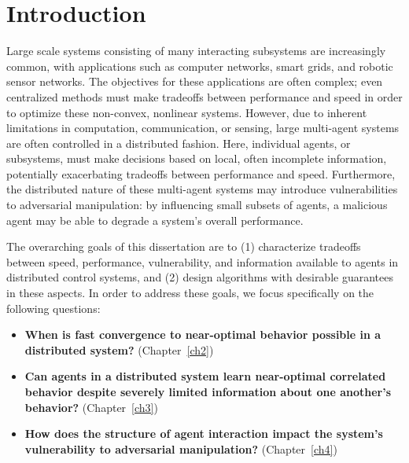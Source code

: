 \chapter{\Large Introduction}
\label{introchap}

Large scale systems consisting of many interacting subsystems are increasingly common, with applications such as computer networks, smart grids, and robotic sensor networks. The objectives for these applications are often complex; even centralized methods must make tradeoffs between performance and speed in order to optimize these non-convex, nonlinear systems. However, due to inherent limitations in computation, communication, or sensing, large multi-agent systems are often controlled in a distributed fashion. Here, individual agents, or subsystems, must make decisions based on local, often incomplete information, potentially exacerbating tradeoffs between performance and speed. Furthermore, the distributed nature of these multi-agent systems may introduce vulnerabilities to adversarial manipulation: by influencing small subsets of agents, a malicious agent may be able to degrade a system's overall performance.%

The overarching goals of this dissertation are to (1) characterize tradeoffs between speed, performance, vulnerability, and information available to agents in distributed control systems, and (2) design algorithms with desirable guarantees in these aspects. %
In order to address these goals, we focus specifically on the following questions:


\begin{itemize}[leftmargin=*]
\item \textbf{When is fast convergence to near-optimal behavior possible in a distributed system?} (Chapter~\ref{ch2})
\item\textbf{Can agents in a distributed system learn near-optimal correlated behavior despite severely limited information about one another's behavior?} (Chapter~\ref{ch3})
\item\textbf{How does the structure of agent interaction impact the system's vulnerability to adversarial manipulation?} (Chapter~\ref{ch4})
\end{itemize}

